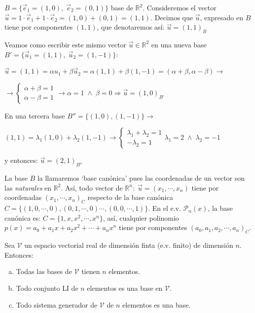 $B=\{ \vec e_1=(1,0),\; \vec e_2=(0,1)\}$ base de $\mathbb R^2$. Consideremos el vector $\vec u=1\cdot \vec e_1+ 1 \cdot \vec e_2=(1,0)+(0,1)=(1,1)$. Decimos que $\vec u$, expresado en $B$ tiene por componentes $(1,1)$, que denotaremos así: $\vec u=(1,1)_B$

Veamos como escribir este mismo vector $\vec u \in \mathbb R^2$ en una nueva base $B'=\{ \vec u_1=(1,1),\; \vec u_2=(1,-1)\}$: 

\noindent $\vec u=(1,1)=\alpha u_1+\beta \vec u_2=\alpha (1,1)+\beta (1,-1)=(\alpha+\beta, \alpha-\beta)\to $

\noindent $\to \begin{cases} \alpha+\beta=1 \\ \alpha-\beta=1 \end{cases} \to \alpha=1\; \wedge \; \beta =0 \Rightarrow \vec u=(1,0)_{B'} $

En una tercera base $B''=\{(1,0),(1,-1)\} \to $

\noindent $(1,1) =  \lambda_1 (1,0) + \lambda_2 (1,-1) \to \begin{cases} \lambda_1 +\lambda_2=1 \\ -\lambda_2=1 \end{cases} \lambda_1=2\;\wedge \; \lambda_2=-1  $

\noindent y entonces: $\vec u=(2,1)_{B''}$

La base $B$ la llamaremos `base canónica' pues las coordenadas de un vector son las \emph{naturales} en $\mathbb R^2$. Así, todo vector de $\mathbb R^n:\; \vec u= (x_1, \cdots, x_n)$ tiene por coordenadas $(x_1, \cdots, x_n)_C$ respecto de la base canónica $C=\{(1,0,\cdots ,0),(0,1,\cdots, 0) \cdots , (0,0,\cdots ,1)\}$. En el e.v. $\mathcal P_n(x)$, la base canónica es: $C=\{ 1,x,x^2, \cdots, x^n\}$, así, cualquier polinomio $p(x)=a_0+a_1x+a_2x^2+ \cdots + a_nx^n$ tiene por componentes $(a_0,a_1,a_2, \cdots , a_n)_C$.

\begin{theorem}

Sea $\mathcal V$ un espacio vectorial real de dimensión finta (e.v. finito) de dimensión $n$. Entonces:

\begin{enumerate}[a) ]	
\item Todas las bases de $\mathcal V$ tienen $n$ elementos.
\item Todo conjunto LI de $n$ elementos es una base en $\mathcal V$.
\item Todo sistema generador de $\mathcal V$ de $n$ elementos es una base.	
\end{enumerate}

\end{theorem}



